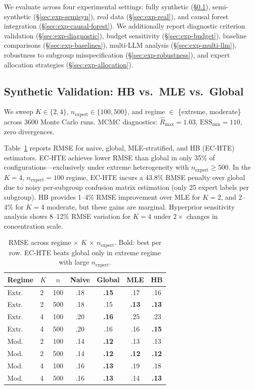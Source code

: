 \documentclass[11pt]{article}
\begin{document}
We evaluate across four experimental settings: fully synthetic (\S\ref{sec:exp-synthetic}), semi-synthetic (\S\ref{sec:exp-semisyn}), real data (\S\ref{sec:exp-real}), and causal forest integration (\S\ref{sec:exp-causal-forest}).
We additionally report diagnostic criterion validation (\S\ref{sec:exp-diagnostic}), budget sensitivity (\S\ref{sec:exp-budget}), baseline comparisons (\S\ref{sec:exp-baselines}), multi-LLM analysis (\S\ref{sec:exp-multi-llm}), robustness to subgroup misspecification (\S\ref{sec:exp-robustness}), and expert allocation strategies (\S\ref{sec:exp-allocation}).

\subsection{Synthetic Validation: HB vs.\ MLE vs.\ Global}
\label{sec:exp-synthetic}

We sweep $K \in \{2,4\}$, $n_{\text{expert}} \in \{100, 500\}$, and regime $\in$ \{extreme, moderate\} across 3600 Monte Carlo runs.
MCMC diagnostics: $\hat{R}_{\max} = 1.03$, $\text{ESS}_{\min} = 110$, zero divergences.

Table~\ref{tab:hb-synthetic} reports RMSE for naive, global, MLE-stratified, and HB (EC-HTE) estimators.
EC-HTE achieves lower RMSE than global in only 35\% of configurations---exclusively under extreme heterogeneity with $n_{\text{expert}} \geq 500$.
In the $K{=}4$, $n_{\text{expert}}{=}100$ regime, EC-HTE incurs a 43.8\% RMSE penalty over global due to noisy per-subgroup confusion matrix estimation (only 25 expert labels per subgroup).
HB provides 1--4\% RMSE improvement over MLE for $K{=}2$, and 2--4\% for $K{=}4$ moderate, but these gains are marginal.
Hyperprior sensitivity analysis shows 8--12\% RMSE variation for $K{=}4$ under $2\times$ changes in concentration scale.

\begin{table}[t]
\centering
\small
\caption{RMSE across regime $\times$ $K$ $\times$ $n_{\text{expert}}$. Bold: best per row. EC-HTE beats global only in extreme regime with large $n_{\text{expert}}$.}
\label{tab:hb-synthetic}
\begin{tabular}{@{}llccccc@{}}
\toprule
Regime & $K$ & $n$ & Naive & Global & MLE & HB \\
\midrule
Extr. & 2 & 100 & .18 & \textbf{.15} & .17 & .16 \\
Extr. & 2 & 500 & .18 & .15 & \textbf{.13} & \textbf{.13} \\
Extr. & 4 & 100 & .20 & \textbf{.16} & .25 & .23 \\
Extr. & 4 & 500 & .20 & .16 & .16 & \textbf{.15} \\
Mod. & 2 & 100 & .14 & \textbf{.12} & .13 & .13 \\
Mod. & 2 & 500 & .14 & \textbf{.12} & \textbf{.12} & \textbf{.12} \\
Mod. & 4 & 100 & .16 & \textbf{.13} & .19 & .18 \\
Mod. & 4 & 500 & .16 & \textbf{.13} & .14 & \textbf{.13} \\
\bottomrule
\end{tabular}
\end{table}
\end{document}
